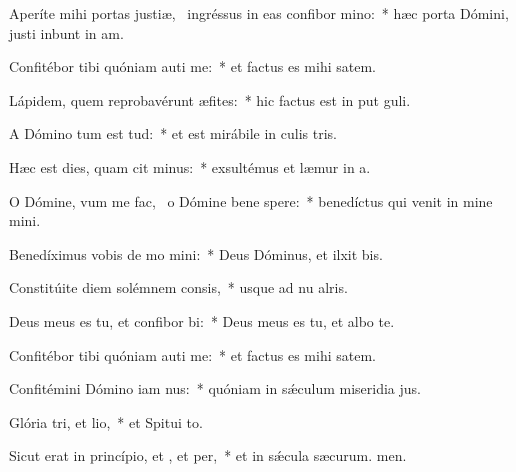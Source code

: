 \item Aperíte mihi portas justiæ,~\pscross{} ingréssus in eas confibor mino:~* hæc porta Dómini, justi inbunt in am.
\item Confitébor tibi quóniam auti me:~* et factus es mihi  satem.
\item Lápidem, quem reprobavérunt æfites:~* hic factus est in put guli.
\item A Dómino tum est tud:~* et est mirábile in culis tris.
\item Hæc est dies, quam cit minus:~* exsultémus et læmur in a.
\item O Dómine, vum me fac,~\pscross{} o Dómine bene spere:~* benedíctus qui venit in mine mini.
\item Benedíximus vobis de mo mini:~* Deus Dóminus, et ilxit bis.
\item Constitúite diem solémnem  consis,~* usque ad nu alris.
\item Deus meus es tu, et confibor bi:~* Deus meus es tu, et albo te.
\item Confitébor tibi quóniam auti me:~* et factus es mihi  satem.
\item Confitémini Dómino iam nus:~* quóniam in sǽculum miseridia jus.
\item Glória tri, et lio,~* et Spitui to.
\item Sicut erat in princípio, et , et per,~* et in sǽcula sæcurum. men.
